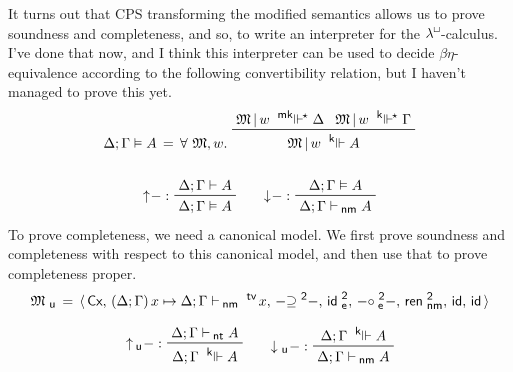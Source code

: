 \documentclass{entcs}
\newcommand{\lambdabox}{\lambda^{\mkern-1mu\sq\mkern-2mu}}
\newcommand{\binop}[1]{-\mathord{#1}-}
\newcommand{\tsf}[1]{\textsf{\upshape{#1}}}
\newcommand{\stsf}[1]{\tsf{\small{#1}}}
\renewcommand{\:}{\mathrel{:}}
\newcommand{\tyrule}[1]{\prftree[l]{${#1} \:\,$}}
\newcommand{\id}{\operatorname{\tsf{id}}}
\renewcommand{\;}{\mathbin{;}}
\let\oldforall\forall
\renewcommand{\forall}{\oldforall\,}
\newcommand{\0}{\varnothing}
\newcommand{\geqZ}{\mathrel{\supseteq^{\stsf{2}}}}
\newcommand{\ideZ}{\operatorname{\tsf{id}_{\stsf{e}}^{\stsf{2}}}}
\newcommand{\compeZ}{\mathrel{\circ_{\mkern-1mu\stsf{e}}^{\stsf{2}}}}
\newcommand{\tvar}{\operatorname{^{\stsf{tv}\mkern-1mu}}}
\newcommand{\sq}{\Box}
\newcommand{\Cx}{\tsf{Cx}}
\renewcommand{\e}{\mathrel{\vdash}}
\newcommand{\enm}{\mathrel{\vdash_{\mkern-2mu\stsf{nm}}}}
\newcommand{\ent}{\mathrel{\vdash_{\mkern-2mu\stsf{nt}}}}
\newcommand{\rennmZ}{\operatorname{\tsf{ren}_{\stsf{nm}}^{\stsf{2}}}}
\newcommand{\M}{\mathfrak{M}}
\newcommand{\kee}{\mathrel{^{\stsf{k}\mkern-6mu}\Vdash}}
\newcommand{\kees}{\mathrel{^{\stsf{k}\mkern-6mu}\Vdash^{\mkern-2mu\star}}}
\newcommand{\mkees}{\mathrel{^{\stsf{mk}\mkern-6mu}\Vdash^{\mkern-2mu\star}}}
\newcommand{\eeq}{\mathrel{\vDash}}
\newcommand{\reflect}{\uparrow\mkern-4mu}
\newcommand{\Mu}{\mathfrak{M}_{\stsf{u}}}
\newcommand{\reifyu}{\downarrow_{\stsf{u}}\mkern-4mu}
\newcommand{\reflectu}{\uparrow_{\mkern-2mu\stsf{u}}\mkern-4mu}
\newcommand{\reify}{\downarrow\mkern-4mu}
\begin{document}
It turns out that CPS transforming the modified semantics allows us to prove soundness and completeness, and so, to write an interpreter for the $\lambdabox$-calculus.  I've done that now, and I think this interpreter can be used to decide $\beta\eta$-equivalence according to the following convertibility relation, but I haven't managed to prove this yet.
\begin{gather*}
  \Delta; \Gamma \eeq A\,=\,\forall \M, w.\ \prftree{\M\,|\,w \mkees \Delta}{\M\,|\,w \kees \Gamma}{\M\,|\,w \kee A}\\[\baselineskip]
  \tyrule{\reflect{-}}{\Delta; \Gamma \e A}{\Delta; \Gamma \eeq A}
  \qquad
  \tyrule{\reify{-}}{\Delta; \Gamma \eeq A}{\Delta; \Gamma \enm A}
\end{gather*}
To prove completeness, we need a canonical model.  We first prove soundness and completeness with respect to this canonical model, and then use that to prove completeness proper.
\begin{gather*}
  \Mu\,=\,\langle\,\Cx,\,(\Delta; \Gamma)\,x \mapsto \Delta; \Gamma \enm \tvar x,\,\binop{\geqZ},\,\ideZ,\,\binop{\compeZ},\,\rennmZ,\,\id,\,\id\,\rangle\\[0.5\baselineskip]
  \tyrule{\reflectu{-}}{\Delta; \Gamma \ent A}{\Delta; \Gamma \kee A}
  \qquad
  \tyrule{\reifyu{-}}{\Delta; \Gamma \kee A}{\Delta; \Gamma \enm A}
\end{gather*}
%
%
\end{document}

